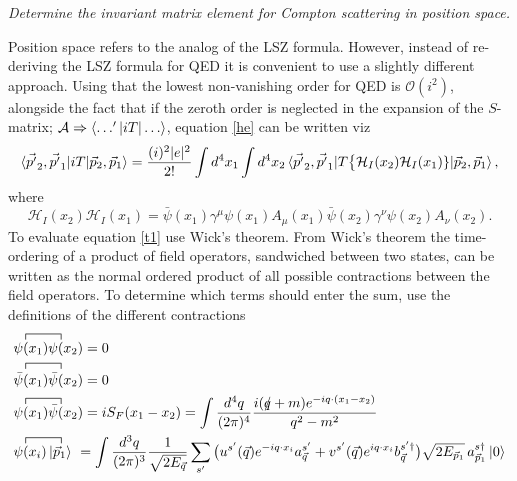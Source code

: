 \begin{example}
\end{example}


\begin{example}
	\emph{Determine the invariant matrix element for Compton scattering in position space.}\newline
	
	Position space refers to the analog of the LSZ formula. However, instead of re-deriving the LSZ formula for QED it is convenient to use a slightly different approach. Using that the lowest non-vanishing order for QED is $\mathcal{O}(i^2)$, alongside the fact that if the zeroth order is neglected in the expansion of the $S$-matrix; $\mathcal{A}\Rightarrow \braket{\dots'|iT|\dots}$, equation \eqref{he} can be written viz
	\begin{equation}
		\begin{split}
			\braket{\vec{p'}_2,\vec{p'}_1|iT|\vec{p}_2, \vec{p}_1}&=\frac{(i)^2|e|^2}{2!}\int d^4x_1\int d^4 x_2\braket{\vec{p'}_2,\vec{p'}_1|T\big\{\mathcal{H}_I(x_2)\mathcal{H}_I(x_1)\}|\vec{p}_2,\vec{p}_1},\\
		\end{split}
		\label{t1}
	\end{equation} 
	where
	\begin{equation}
		\mathcal{H}_I(x_2)\mathcal{H}_I(x_1)=\bar{\psi}(x_1)\gamma^\mu\psi(x_1)A_\mu(x_1)\bar{\psi}(x_2)\gamma^\nu\psi(x_2)A_\nu(x_2).
	\end{equation} 
	To evaluate equation \ref{t1} use Wick's theorem. From Wick's theorem the time-ordering of a product of field operators, sandwiched between two states, can be written as the normal ordered product of all possible contractions between the field operators. To determine which terms should enter the sum, use the definitions of the different contractions
	\begin{equation}
		\begin{split}
			&\contraction{0}{\psi}{(x_1)}{\psi}
			\psi(x_1)\psi(x_2)=0 \\
			&\contraction{0}{\bar{\psi}}{(x_1)}{\bar{\psi}}
			\bar{\psi}(x_1)\bar{\psi}(x_2)=0\\
			&\contraction{0}{\psi}{(x_1)}{\bar{\psi}}
			\psi(x_1)\bar{\psi}(x_2)=iS_F(x_1-x_2)=\int\frac{d^4q}{(2\pi)^4}\frac{i(\slashed q+m)e^{-iq\cdot(x_1-x_2)}}{q^2-m^2}\\
			&\contraction{0}{\psi}{(x_i)}{\vec{p}_1}
			\psi(x_i)\ket{\vec{p}_1}\,\,=\int\frac{d^3q}{(2\pi)^3}\frac{1}{\sqrt{2E_{\vec{q}}}}\sum_{s'}\big(u^{s'}(\vec{q})e^{-iq\cdot x_i}a^{s'}_{\vec{q}}+v^{s'}(\vec{q})e^{iq\cdot x_i}b^{s'\dagger}_{\vec{q}}\big)\sqrt{2E_{\vec{p}_1}}\,a^{s\dagger}_{\vec{p}_1}\ket{0}\\

\end{split}
\end{equation}
\end{example}
